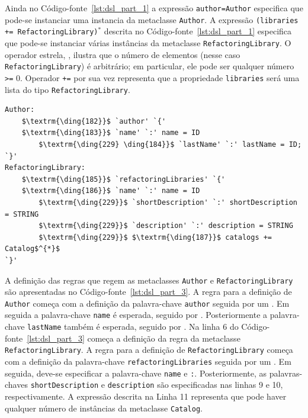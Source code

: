 Ainda no Código-fonte~\ref{lst:dsl_part_1} a expressão \texttt{author=Author} especifica que pode-se instanciar uma instancia da metaclasse \texttt{Author}. A expressão \texttt{(libraries += RefactoringLibrary)$^{*}$} descrita no Código-fonte~\ref{lst:dsl_part_1} especifica que pode-se instanciar várias instâncias da metaclasse \texttt{RefactoringLibrary}. O operador estrela, \aspas{\texttt{*}}, ilustra que o número de elementos (nesse caso \texttt{RefactoringLibrary}) é arbitrário; em particular, ele pode ser qualquer número \texttt{>=} 0. Operador \texttt{+=} por sua vez representa que a propriedade \texttt{libraries} será uma lista do tipo \texttt{RefactoringLibrary}.

\begin{lstlisting}[language=Xtext, frame=single, basicstyle=\scriptsize, mathescape=true, label={lst:dsl_part_3}, caption={Gramática da DSL - parte 3}]
Author:
	$\textrm{\ding{182}}$ `author' `{'
	$\textrm{\ding{183}}$ `name' `:' name = ID  
		$\textrm{\ding{229} \ding{184}}$ `lastName' `:' lastName = ID; 
`}'
RefactoringLibrary:
	$\textrm{\ding{185}}$ `refactoringLibraries' `{'
	$\textrm{\ding{186}}$ `name' `:' name = ID  
		$\textrm{\ding{229}}$ `shortDescription' `:' shortDescription = STRING
		$\textrm{\ding{229}}$ `description' `:' description = STRING
		$\textrm{\ding{229}}$ $\textrm{\ding{187}}$ catalogs += Catalog$^{*}$
`}'
\end{lstlisting}

A definição das regras que regem as metaclasses \texttt{Author} e \texttt{RefactoringLibrary} são apresentadas no Código-fonte~\ref{lst:dsl_part_3}. A regra para a definição de \texttt{Author} começa com a definição da palavra-chave \texttt{author} seguida por um \aspas{\{}. Em seguida a palavra-chave \texttt{name} é esperada, seguido por \aspas{\texttt{:}} . Posteriormente a palavra-chave \texttt{lastName} também é esperada, seguido por \aspas{\texttt{:}} . Na linha 6 do Código-fonte~\ref{lst:dsl_part_3} começa a definição da regra da metaclasse \texttt{RefactoringLibrary}. A regra para a definição de \texttt{RefactoringLibrary} começa com a definição da palavra-chave \texttt{refactoringLibraries} seguida por um \aspas{\{}. Em seguida, deve-se especificar a palavra-chave \texttt{name} e \texttt{:}. Posteriormente, as palavras-chaves \texttt{shortDescription} e \texttt{description} são especificadas nas linhas 9 e 10, respectivamente. A expressão descrita na Linha 11 representa que pode haver qualquer número de instâncias da metaclasse \texttt{Catalog}.

